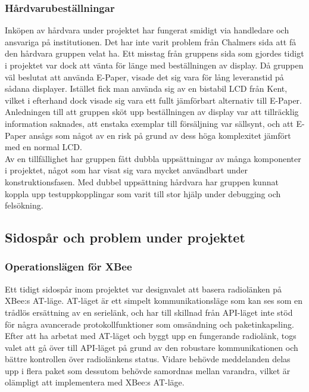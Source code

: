 \documentclass[a4paper,11pt]{article}
\begin{document}
\subsubsection{Hårdvarubeställningar}
Inköpen av hårdvara under projektet har fungerat smidigt via handledare och ansvariga på institutionen. Det har inte varit problem från Chalmers sida att få den hårdvara gruppen velat ha. Ett misstag från gruppens sida som gjordes tidigt i projektet var dock att vänta för länge med beställningen av display. Då gruppen väl beslutat att använda E-Paper, visade det sig vara för lång leveranstid på sådana displayer. Istället fick man använda sig av en bistabil LCD från Kent, vilket i efterhand dock visade sig vara ett fullt jämförbart alternativ till E-Paper. Anledningen till att gruppen sköt upp beställningen av display var att tillräcklig information saknades, att enstaka exemplar till försäljning var sällsynt, och att E-Paper ansågs som något av en risk på grund av dess höga komplexitet jämfört med en normal LCD.\\

Av en tillfällighet har gruppen fått dubbla uppsättningar av många komponenter i projektet, något som har visat sig vara mycket användbart under konstruktionsfasen. Med dubbel uppsättning hårdvara har gruppen kunnat koppla upp testuppkopplingar som varit till stor hjälp under debugging och felsökning.

\subsection{Sidospår och problem under projektet}

\subsubsection{Operationslägen för XBee}
Ett tidigt sidospår inom projektet var designvalet att basera radiolänken på XBee:s AT-läge. AT-läget är ett simpelt kommunikationsläge som kan ses som en trådlös ersättning av en serielänk, och har till skillnad från API-läget inte stöd för några avancerade protokollfunktioner som omsändning och paketinkapsling. Efter att ha arbetat med AT-läget och byggt upp en fungerande radiolänk, togs valet att gå över till API-läget på grund av den robustare kommunikationen och bättre kontrollen över radiolänkens status. Vidare behövde meddelanden delas upp i flera paket som dessutom behövde samordnas mellan varandra, vilket är olämpligt att implementera med XBee:s AT-läge.
\end{document}
